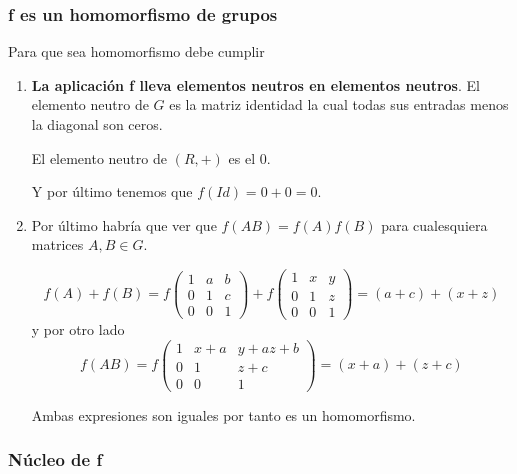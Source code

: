 \documentclass[12pt]{article}
\begin{document}
\subsubsection*{f es un homomorfismo de grupos}

Para que sea homomorfismo debe cumplir 
\begin{enumerate}
    \item \textbf{ La aplicación f lleva elementos neutros en elementos neutros}.
    El elemento neutro de $G$ es la matriz identidad la cual todas sus entradas
    menos la diagonal son ceros. 

    El elemento neutro de $(R,+)$ es el $0.$

    Y por último tenemos que $f(Id) = 0+0 = 0.$

    \item Por último habría que ver que $f(AB) = f(A)f(B)$ 
    para cualesquiera matrices $A,B \in G.$

    \begin{equation*}
        f(A)+ f(B)= 
        f 
        \begin{pmatrix}
            1 & a &  b\\
            0 & 1 & c\\
            0 & 0 & 1
            \end{pmatrix}
           +
            f %
        \begin{pmatrix}
            1 & x & y \\
            0 & 1 & z \\
            0 & 0 & 1
            \end{pmatrix}
            = (a+c)+(x + z) 
    \end{equation*}
    y por otro lado
    \begin{equation*}
        f(AB)= 
        f %
        \begin{pmatrix}
            1 & x+a & y + az + b\\
            0 & 1 & z + c\\
            0 & 0 & 1
            \end{pmatrix}
            = (x+a)+(z+c) 
    \end{equation*}
    
    Ambas expresiones son iguales por tanto es un homomorfismo. 
\end{enumerate}

\subsubsection*{Núcleo de f}
\end{document}

